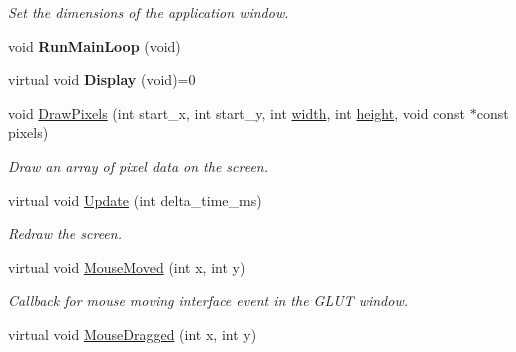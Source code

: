 \begin{DoxyCompactItemize}
\begin{DoxyCompactList}\small\item\em Set the dimensions of the application window. \end{DoxyCompactList}\item 
void {\bfseries Run\+Main\+Loop} (void)\hypertarget{classimage__tools_1_1BaseGfxApp_a62fae03316774a28455f766ce808a814}{}\label{classimage__tools_1_1BaseGfxApp_a62fae03316774a28455f766ce808a814}

\item 
virtual void {\bfseries Display} (void)=0\hypertarget{classimage__tools_1_1BaseGfxApp_aba7ae5ed9a1d794d8c6c4be1d5fa4722}{}\label{classimage__tools_1_1BaseGfxApp_aba7ae5ed9a1d794d8c6c4be1d5fa4722}

\item 
void \hyperlink{classimage__tools_1_1BaseGfxApp_afec9de9223c9fc7acb2d01ec7d5283a2}{Draw\+Pixels} (int start\+\_\+x, int start\+\_\+y, int \hyperlink{classimage__tools_1_1BaseGfxApp_a2fe403c5392f624477c2ce4429f1a7b5}{width}, int \hyperlink{classimage__tools_1_1BaseGfxApp_aa961e13a7a8e6062204223cc33ac7503}{height}, void const $\ast$const pixels)\hypertarget{classimage__tools_1_1BaseGfxApp_afec9de9223c9fc7acb2d01ec7d5283a2}{}\label{classimage__tools_1_1BaseGfxApp_afec9de9223c9fc7acb2d01ec7d5283a2}

\begin{DoxyCompactList}\small\item\em Draw an array of pixel data on the screen. \end{DoxyCompactList}\item 
virtual void \hyperlink{classimage__tools_1_1BaseGfxApp_ad07efe6b7a1f140ccdb9a41d12fc1913}{Update} (int delta\+\_\+time\+\_\+ms)
\begin{DoxyCompactList}\small\item\em Redraw the screen. \end{DoxyCompactList}\item 
virtual void \hyperlink{classimage__tools_1_1BaseGfxApp_ab2aa4111469862051287ba2b9983224d}{Mouse\+Moved} (int x, int y)
\begin{DoxyCompactList}\small\item\em Callback for mouse moving interface event in the G\+L\+UT window. \end{DoxyCompactList}\item 
virtual void \hyperlink{classimage__tools_1_1BaseGfxApp_ac4fa9008fc0d0748c45e5bbe610efa45}{Mouse\+Dragged} (int x, int y)\hypertarget{classimage__tools_1_1BaseGfxApp_ac4fa9008fc0d0748c45e5bbe610efa45}{}\label{classimage__tools_1_1BaseGfxApp_ac4fa9008fc0d0748c45e5bbe610efa45}


\end{DoxyCompactItemize}
